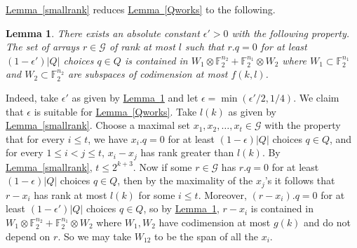 \documentclass[11pt]{article}
\numberwithin{equation}{section}
\newtheorem{lemma}[theorem]{Lemma}
\theoremstyle{definition}
\theoremstyle{plain}
\newcommand{\expref}[2]{\hyperref[#2]{#1~\ref{#2}}}
\newcommand\eps{\epsilon}  %
\newcommand\F{\mathbb{F}}
\newcommand \cG{\mathcal G}
\newcommand \s{\subset}
\begin{document}
\expref{Lemma}{smallrank} reduces \expref{Lemma}{Qworks} to the following.

\begin{lemma} \label{reduced}
	There exists an absolute constant $\eps'>0$ with the following property. The set of arrays $r\in \cG$ of rank at most $l$ such that $r.q=0$ for at least $(1-\eps')|Q|$ choices $q\in Q$ is contained in $W_1\otimes \F_2^{n_2}+\F_2^{n_1}\otimes W_2$ where $W_1\s \F_2^{n_1}$ and $W_2\s \F_2^{n_2}$ are subspaces of codimension at most $f(k,l)$.
\end{lemma}

Indeed, take $\eps'$ as given by \expref{Lemma}{reduced} and let $\eps=\min(\eps'/2,1/4)$. We claim that $\eps$ is suitable for \expref{Lemma}{Qworks}. Take $l(k)$ as given by \expref{Lemma}{smallrank}.
Choose a maximal set $x_1,x_2,\dots,x_t\in \cG$ with the property that for every $i\leq t$, we have $x_i.q=0$ for at least $(1-\eps)|Q|$ choices $q\in Q$, and for every $1\leq i<j\leq t$, $x_i-x_j$ has rank greater than $l(k)$. By \expref{Lemma}{smallrank}, $t\leq 2^{k+3}$. Now if some $r\in \cG$ has $r.q=0$ for at least $(1-\eps)|Q|$ choices $q\in Q$, then by the maximality of the $x_j$'s it follows that $r-x_i$ has rank at most $l(k)$ for some $i\leq t$. Moreover, $(r-x_i).q=0$ for at least $(1-\eps')|Q|$ choices $q\in Q$, so by \expref{Lemma}{reduced}, $r-x_i$ is contained in $W_1\otimes \F_2^{n_2}+\F_2^{n_1}\otimes W_2$ where $W_1,W_2$ have codimension at most $g(k)$ and do not depend on $r$. So we may take $W_{12}$ to be the span of all the $x_i$.
%
\end{document}
